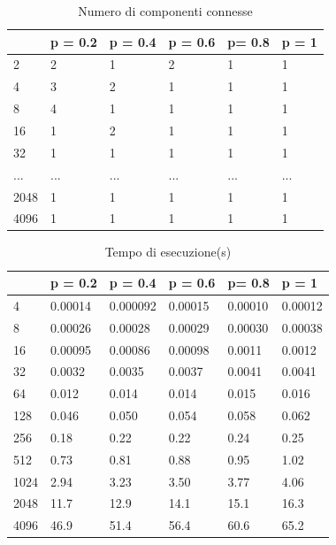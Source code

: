 \documentclass[]{article}
\begin{document}
\begin{table}[H]
\centering
\label{fig:ccs_n}
\caption{Numero di componenti connesse}
\begin{tabular}{|l|l|l|l|l|l|} 
\cline{2-6}
\multicolumn{1}{l|}{} & p = 0.2 & p = 0.4 & p = 0.6 & p= 0.8 & p = 1  \\ 
\hline
2                     & 2       & 1       & 2       & 1      & 1      \\
4                     & 3       & 2       & 1       & 1      & 1      \\
8                     & 4       & 1       & 1       & 1      & 1      \\
16                    & 1       & 2       & 1       & 1      & 1      \\
32                    & 1       & 1       & 1       & 1      & 1      \\
...                   & ...     & ...     & ...     & ...    & ...    \\
2048                  & 1       & 1       & 1       & 1      & 1      \\
4096                  & 1       & 1       & 1       & 1      & 1      \\
\hline
\end{tabular}
\end{table}

\begin{table}[H]
\centering
\caption{Tempo di esecuzione(s)}
\label{tab:ccs_time}
\begin{tabular}{|l|l|l|l|l|l|} 
\cline{2-6}
\multicolumn{1}{l|}{} & p = 0.2 & p = 0.4  & p = 0.6 & p= 0.8  & p = 1    \\ 
\hline
4                     & 0.00014 & 0.000092 & 0.00015 & 0.00010 & 0.00012  \\
8                     & 0.00026 & 0.00028  & 0.00029 & 0.00030 & 0.00038  \\
16                    & 0.00095 & 0.00086  & 0.00098 & 0.0011  & 0.0012   \\
32                    & 0.0032  & 0.0035   & 0.0037  & 0.0041  & 0.0041   \\
64                    & 0.012   & 0.014    & 0.014   & 0.015   & 0.016    \\
128                   & 0.046   & 0.050    & 0.054   & 0.058   & 0.062    \\
256                   & 0.18    & 0.22     & 0.22    & 0.24    & 0.25     \\
512                   & 0.73    & 0.81     & 0.88    & 0.95    & 1.02     \\
1024                  & 2.94    & 3.23     & 3.50    & 3.77    & 4.06     \\
2048                  & 11.7    & 12.9     & 14.1    & 15.1    & 16.3     \\
4096                  & 46.9    & 51.4     & 56.4    & 60.6    & 65.2     \\
\hline
\end{tabular}
\end{table}
\end{document}
